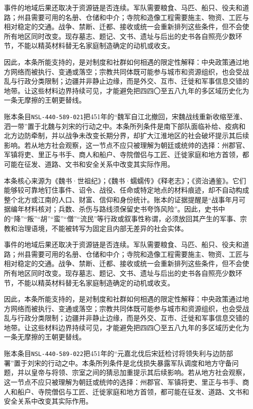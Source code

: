 事件的地域后果还取决于资源链是否连续。军队需要粮食、马匹、船只、役夫和道路；州县需要可用的名册、仓储和中介；寺院和造像工程需要施主、物资、工匠与相对稳定的交通。战争、禁断、迁都、接收或统一会重新排列这些条件，但不会使所有地区同时改变。现存墓志、题记、文书、遗址与后出的史书各自照亮少数环节，不能以精英材料替无名家庭制造确定的动机或收支。

因此，本条所能支持的，是对制度和社群如何相遇的限定性解释：中央政策通过地方网络而被执行、变通或落空；宗教共同体既可能参与城市和资源组织，也会受战乱与行政分类限制；边疆并非静止边缘，而是外交、互市、迁徙和军事信息交错的地带。让这些材料边界持续可见，才能避免把四四〇至五八九年的多区域历史化为一条无摩擦的王朝更替线。

账本条目\texttt{NSL-440-589-021}把451年的“魏军自江北撤回，宋魏战线重新收缩至淮、泗一带”置于北魏与刘宋的行动之中。本条所列条件是南下部队面临补给、疫病和北方边防牵制，并以战争未改变长期分界，却扩大江淮地区的社会破坏提示其后续影响。若从地方社会观察，这一节点不应只被理解为朝廷或统帅的选择：州郡官、军镇将吏、里正与书手、商人和船户、寺院僧侣与工匠、迁徙家庭和地方首领，都可能在征发、道路、文书和安全关系中改变其实际作用。

本条核心来源为《魏书·世祖纪》；《魏书·蠕蠕传》《释老志》；《资治通鉴》。它们能够较可靠地钉住事件、诏令、战役、任命或特定地点的材料痕迹，却不自动构成整个北方或江南的人口、财富、信仰和身份统计。账本的证据提醒是“战事年月可据编年材料核对；兵数、杀伤与路线须保留史书夸饰风险”。因此，史书中的“降”“叛”“胡”“蛮”“僧”“流民”等行政或叙事性称谓，必须放回其产生的军事、宗教和治理语境，不能被转写为固定且内部无差异的社会实体。

事件的地域后果还取决于资源链是否连续。军队需要粮食、马匹、船只、役夫和道路；州县需要可用的名册、仓储和中介；寺院和造像工程需要施主、物资、工匠与相对稳定的交通。战争、禁断、迁都、接收或统一会重新排列这些条件，但不会使所有地区同时改变。现存墓志、题记、文书、遗址与后出的史书各自照亮少数环节，不能以精英材料替无名家庭制造确定的动机或收支。

因此，本条所能支持的，是对制度和社群如何相遇的限定性解释：中央政策通过地方网络而被执行、变通或落空；宗教共同体既可能参与城市和资源组织，也会受战乱与行政分类限制；边疆并非静止边缘，而是外交、互市、迁徙和军事信息交错的地带。让这些材料边界持续可见，才能避免把四四〇至五八九年的多区域历史化为一条无摩擦的王朝更替线。

账本条目\texttt{NSL-440-589-022}把451年的“元嘉北伐后宋廷检讨将领失利与边防部署”置于刘宋的行动之中。本条所列条件是北伐损失暴露军队调度和地方守备问题，并以皇帝与将领、宗室之间的猜忌加重提示其后续影响。若从地方社会观察，这一节点不应只被理解为朝廷或统帅的选择：州郡官、军镇将吏、里正与书手、商人和船户、寺院僧侣与工匠、迁徙家庭和地方首领，都可能在征发、道路、文书和安全关系中改变其实际作用。

